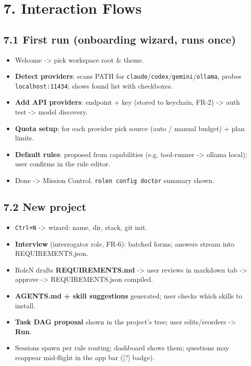 \documentclass[10pt,a4paper]{article}
\begin{document}
\section{7. Interaction Flows}
\subsection{7.1 First run (onboarding wizard, runs once)}
\begin{itemize}
  \item Welcome -> pick workspace root \& theme.
  \item \textbf{Detect providers}: scans PATH for \texttt{claude}/\texttt{codex}/\texttt{gemini}/\texttt{ollama}, probes
\texttt{localhost:11434}; shows found list with checkboxes.

  \item \textbf{Add API providers}: endpoint + key (stored to keychain, FR-2) -> auth test ->
model discovery.

  \item \textbf{Quota setup}: for each provider pick source (auto / manual budget) + plan limits.
  \item \textbf{Default rules}: proposed from capabilities (e.g. tool-runner -> ollama local);
user confirms in the rule editor.

  \item Done -> Mission Control. \texttt{rolen config doctor} summary shown.
\end{itemize}
\subsection{7.2 New project}
\begin{itemize}
  \item \texttt{Ctrl+N} -> wizard: name, dir, stack, git init.
  \item \textbf{Interview} (interrogator role, FR-6): batched forms; answers stream into REQUIREMENTS.json.
  \item RoleN drafts \textbf{REQUIREMENTS.md} -> user reviews in markdown tab -> approve -> REQUIREMENTS.json compiled.
  \item \textbf{AGENTS.md + skill suggestions} generated; user checks which skills to install.
  \item \textbf{Task DAG proposal} shown in the project's tree; user edits/reorders -> \textbf{Run}.
  \item Sessions spawn per rule routing; dashboard shows them; questions may reappear
mid-flight in the app bar ([?] badge).

\end{itemize}
\end{document}
